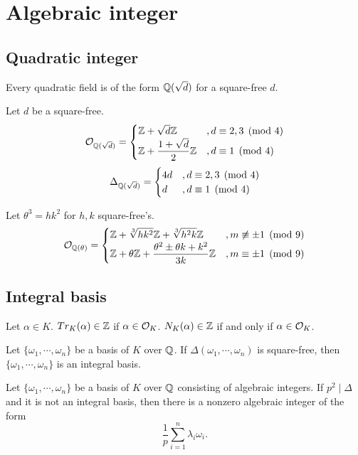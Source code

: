 \documentclass{article}
\let\realsection\section
\renewcommand\section{\newpage\realsection}
\begin{document}
\section{Algebraic integer}
\subsection{Quadratic integer}
\begin{thm}
Every quadratic field is of the form $\mathbb{Q}(\sqrt d)$ for a square-free $d$.
\end{thm}
\begin{thm}
Let $d$ be a square-free.
\[\mathcal{O}_{\mathbb{Q}(\sqrt d)}=\begin{cases}\mathbb{Z}+\sqrt d\mathbb{Z}&,d\equiv2,3\pmod4\\\displaystyle\mathbb{Z}+\frac{1+\sqrt d}2\mathbb{Z}&,d\equiv1\pmod4\end{cases}\]
\[\Delta_{\mathbb{Q}(\sqrt d)}=\begin{cases}4d&,d\equiv2,3\pmod4\\ d&,d\equiv1\pmod4\end{cases}\]
\end{thm}
\begin{thm}
Let $\theta^3=hk^2$ for $h,k$ square-free's.
\[\mathcal{O}_{\mathbb{Q}(\theta)}=\begin{cases}\displaystyle\mathbb{Z}+\sqrt[3]{hk^2}\mathbb{Z}+\sqrt[3]{h^2k}\mathbb{Z}&,m\not\equiv\pm1\pmod9\\
\displaystyle\mathbb{Z}+\theta\mathbb{Z}+\frac{\theta^2\pm\theta k+k^2}{3k}\mathbb{Z}&,m\equiv\pm1\pmod9\end{cases}\]
\end{thm}
\subsection{Integral basis}
\begin{thm}
Let $\alpha\in K$.
$Tr_K(\alpha)\in\mathbb{Z}$ if $\alpha\in\mathcal{O}_K$.
$N_K(\alpha)\in\mathbb{Z}$ if and only if $\alpha\in\mathcal{O}_K$.
\end{thm}
\begin{thm}
Let $\{\omega_1,\cdots,\omega_n\}$ be a basis of $K$ over $\mathbb{Q}$.
If $\Delta(\omega_1,\cdots,\omega_n)$ is square-free, then $\{\omega_1,\cdots,\omega_n\}$ is an integral basis.
\end{thm}
\begin{thm}
Let $\{\omega_1,\cdots,\omega_n\}$ be a basis of $K$ over $\mathbb{Q}$ consisting of algebraic integers.
If $p^2\mid\Delta$ and it is not an integral basis, then there is a nonzero algebraic integer of the form
\[\frac1p\sum_{i=1}^n\lambda_i\omega_i.\]
\end{thm}
\end{document}

